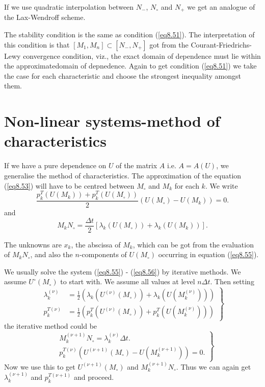 \begin{remark}\label{chap8:rem8.6}
If we use quadratic interpolation between $N_-$, $N_\circ$ and $N_+$ we  get an analogue of the Lax-Wendroff scheme. 
\end{remark}

The stability condition is the same as condition (\ref{eq8.51}). The interpretation of this condition is that $[M_1, M_n] \subset \left[ N_- , N_+ \right]$ got from the Courant-Friedrichs-Lewy convergence condition, viz., the exact domain of dependence must lie within the approximate\pageoriginale domain of depnedence. Again to get condition (\ref{eq8.51}) we take the case for each characteristic and choose the strongest inequality amongst them.

\section{Non-linear systems-method of characteristics}\label{chap8:sec8.10}

If we have a pure dependence on $U$ of the matrix $A$ i.e. $A = A(U)$, we generalise the method of characteristics. The approximation of the equation (\ref{eq8.53}) will have to be centred between $M_\circ$ and $M_k$ for each $k$. We write
\begin{equation*}
\frac{p^T_k (U(M_k)) + p^T_k (U(M_\circ))}{2} (U(M_\circ ) - U(M_k)) = 0. 
\tag{8.55}\label{eq8.55}
\end{equation*}
and 
\begin{equation*}
M_k N_\circ = \frac{\Delta t}{2} [\lambda_k (U(M_\circ)) +\lambda_k(U(M_k))]. \tag{8.56}\label{eq8.56}
\end{equation*}

The unknowns are $x_k$, the abscissa of $M_k$, which can be got from the evaluation of $M_k N_\circ$, and also the $n$-components of $U(M_\circ)$ occurring in equation (\ref{eq8.55}).

We usually solve the system (\ref{eq8.55}) - (\ref{eq8.56}) by iterative methods. We assume $U^\circ (M_\circ)$ to start with. We assume all values  at level $n\Delta t$. Then setting 
\begin{equation*}
\left. 
\begin{aligned}
\lambda^{(\nu)}_k & = \frac{1}{2} (\lambda_k (U^{(\nu)} (M_\circ)) + \lambda_k (U(M^{(\nu)}_k))) \\
p^{T(\nu)}_k & = \frac{1}{2} (p^T_k (U^{(\nu)} (M_\circ)) + p^T_k (U(M^{(\nu)}_k)))
\end{aligned}
\right\}\tag{8.57}\label{eq8.57}
\end{equation*}
the iterative method could be 
\begin{equation*}
\left. 
\begin{aligned}
& M^{(\nu+1)}_k N_\circ = \lambda^{(\nu)}_k \Delta t.\\
&  p^{T(\nu)} _k (U^{(\nu+1)} (M_\circ) - U(M^{(\nu+1)}_k)) =0 . 
\end{aligned}
\right\}\tag{8.58}\label{eq8.58}
\end{equation*}
Now we use this to get $U^{(\nu+1)} (M_\circ)$ and $M^{(\nu+1)}_k N_\circ$. Thus we can again get $\lambda^{(\nu+1)}_k$ and $p^{T(\nu+1)}_k$ and proceed.

